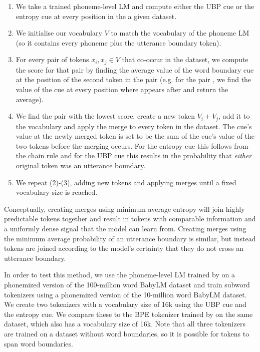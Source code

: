 \begin{enumerate}
    \item We take a trained phoneme-level LM and compute either the UBP cue or the entropy cue at every position in the a given dataset. 
    \item We initialise our vocabulary $V$ to match the vocabulary of the phoneme LM (so it contains every phoneme plus the utterance boundary token).
    \item For every pair of tokens $x_i, x_j \in V$ that co-occur in the dataset, we compute the score for that pair by finding the average value of the word boundary cue at the position of the second token in the pair (e.g. for the pair , we find the value of the cue at every position where  appears after  and return the average). 
    \item We find the pair with the lowest score, create a new token $V_i+V_j$, add it to the vocabulary and apply the merge to every token in the dataset. The cue's value at the newly merged token is set to be the sum of the cue's value of the two tokens before the merging occurs. For the entropy cue this follows from the chain rule and for the UBP cue this results in the probability that \emph{either} original token was an utterance boundary.
    \item We repeat (2)-(3), adding new tokens and applying merges until a fixed vocabulary size is reached.
\end{enumerate}

Conceptually, creating merges using minimum average entropy will join highly predictable tokens together and result in tokens with comparable information and a uniformly dense signal that the model can learn from. Creating merges using the minimum average probability of an utterance boundary is similar, but instead tokens are joined according to the model's certainty that they do not cross an utterance boundary. 

In order to test this method, we use the phoneme-level LM trained by \citet{goriely2024babble} on a phonemized version of the 100-million word BabyLM dataset \citep{choshen-et-al-2024-callforpapers-babylm2} and train subword tokenizers using a phonemized version of the 10-million word BabyLM dataset. We create two tokenizers with a vocabulary size of 16k using the UBP cue and the entropy cue. We compare these to the BPE tokenizer trained by \citet{goriely2024babble} on the same dataset, which also has a vocabulary size of 16k. Note that all three tokenizers are trained on a dataset without word boundaries, so it is possible for tokens to span word boundaries.

